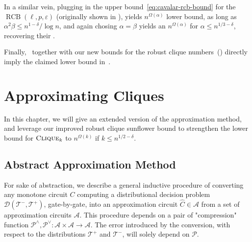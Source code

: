 \documentclass[10pt,a4paper]{article}
\newcommand{\RCB}{\mathop{RCB}}
\newcommand{\cliquep}{\textsc{Clique}}
\newcommand{\jnote}[1]{\todo[inline,backgroundcolor=blue!20!green]{#1 \\ \textsc{--Jarek}}}
\begin{document}
In a similar vein, plugging in the upper bound~\eqref{eq:cavalar-rcb-bound} for the $\RCB(\ell, p, \varepsilon)$ (originally shown in \cite[Lemma 3.2]{cavalar2022}), yields $n^{\Omega(\alpha)}$ lower bound, as long as $\alpha^2 \beta \leq n^{1-\delta}/\log n$, and again chosing $\alpha=\beta$ yields an $n^{\Omega(\alpha)}$ for $\alpha \leq n^{1/3 - \delta}$, recovering their \cite[Theorem 3.23]{cavalar2022}.

Finally,~ together with our new bounds for the robust clique numbers~() directly imply the claimed lower bound in~.

\section{Approximating Cliques \label{sec:approximation-method}}

In this chapter, we will give an extended version of the approximation method, and leverage our improved robust clique sunflower bound to strengthen the lower bound for $\cliquep_k$ to $n^{\Omega(k)}$ if $k\leq n^{1/2 -\delta }$.

\subsection{Abstract Approximation Method}




For sake of abstraction, we describe a general inductive procedure of converting any monotone circuit $C$ computing a distributional decision problem $\mathcal{D}(\mathcal{T}^-, \mathcal{T}^+)$, gate-by-gate, into an approximation circuit $\hat{C} \in \mathcal{A}$ from a set of approximation circuits $\mathcal{A}$. This procedure depends on a pair of "compression" function $\mathcal{P}^{\land}, \mathcal{P}^{\lor}: \mathcal{A} \times \mathcal{A} \rightarrow \mathcal{A}$. The error introduced by the conversion, with respect to the distributions $\mathcal{T}^+$ and $\mathcal{T^-}$, will solely depend on $\mathcal{P}$.
\end{document}
